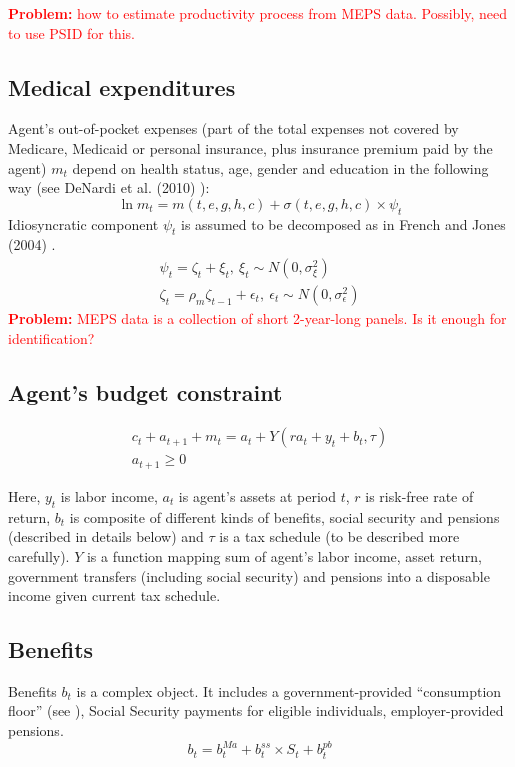 \documentclass[
10pt, %
a4paper, %
oneside, %
headinclude,footinclude, %
BCOR5mm, %
]{scrartcl}
\begin{document}
 \textcolor{red}{\textbf{Problem:} how to estimate productivity process from MEPS data. Possibly, need to use PSID for this.}

\subsection{Medical expenditures}
Agent's out-of-pocket expenses (part of the total expenses not covered by Medicare, Medicaid or personal insurance, plus insurance premium paid by the agent) $m_t$ depend on health status, age, gender and education in the following way (see DeNardi et al. (2010) \cite{DeNardi2010}):
\begin{equation*}
\ln m_t = m(t,e,g,h,c) + \sigma(t,e,g,h,c)\times \psi_t 
\end{equation*}
Idiosyncratic component $\psi_t$ is assumed to be decomposed as in French and Jones (2004) \cite{French2004}.
\begin{eqnarray*}
\psi_t = \zeta_t + \xi_t, \   	\xi_t \sim N(0,\sigma_\xi^2) \\
\zeta_t = \rho_m\zeta_{t-1} + \epsilon_t, \   \epsilon_t \sim N(0,\sigma_\epsilon^2)
\end{eqnarray*}
 \textcolor{red}{\textbf{Problem:} MEPS data is a collection of short 2-year-long panels. Is it enough for identification?}

\subsection{Agent's budget constraint}

\begin{eqnarray*}
c_t + a_{t+1} +m_t = a_t+Y(ra_t+y_t+b_t,\tau)  \\
a_{t+1}\ge0
\end{eqnarray*}

Here, $y_t$ is labor income, $a_t$ is agent's assets at period $t$, $r$ is risk-free rate of return, $b_t$ is composite of different kinds of benefits, social security and pensions (described in details below) and $\tau$ is a tax schedule (to be described more carefully).  $Y$ is a function mapping sum of agent's labor income, asset return, government transfers (including social security) and pensions into a disposable income given current tax schedule.

\subsection{Benefits}
Benefits $b_t$ is a complex object. It includes a government-provided ``consumption floor'' (see \cite{DeNardi2010}), Social Security payments for eligible individuals, employer-provided pensions.
\begin{equation*}
b_t = b_t^{Ma} + b_t^{ss}\times S_t+b_t^{pb}
\end{equation*}
\end{document}
